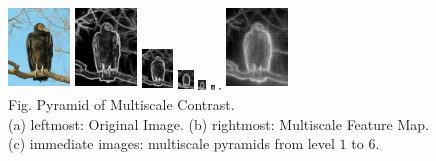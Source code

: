 \documentclass[10pt,twocolumn,letterpaper]{article}
\begin{document}
    \begin{center}    
        \includegraphics[width=0.65in,height=0.9in]{./Figures/pyramid/5_145_145839raw.jpg} \hspace{2mm}
    \includegraphics[width=0.65in,height=0.9in]{./Figures/pyramid/5_145_145839_p0.jpg} 
    \includegraphics[width=0.325in,height=0.45in]{./Figures/pyramid/5_145_145839_p1.jpg} 
    \includegraphics[width=0.1625in,height=0.225in]{./Figures/pyramid/5_145_145839_p2.jpg} 
    \includegraphics[width=0.08125in,height=0.1125in]{./Figures/pyramid/5_145_145839_p3.jpg} 
    \includegraphics[width=0.040625in,height=0.0575in]{./Figures/pyramid/5_145_145839_p4.jpg} 
    \includegraphics[width=0.0203125in,height=0.02825in]{./Figures/pyramid/5_145_145839_p5.jpg} \hspace{1mm}
    \includegraphics[width=0.65in,height=0.9in]{./Figures/pyramid/5_145_145839.jpg} \\
    \footnotesize Fig. Pyramid of Multiscale Contrast.  \\
    (a) leftmost: Original Image. (b) rightmost: Multiscale Feature Map. \\
    (c) immediate images: multiscale pyramids from level $1$ to $6$.
    \end{center}
\end{document}
